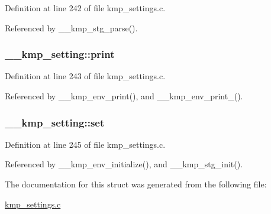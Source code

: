 Definition at line 242 of file kmp\-\_\-settings.\-c.



Referenced by \-\_\-\-\_\-kmp\-\_\-stg\-\_\-parse().

\hypertarget{struct____kmp__setting_a411e543047308db1d704cbff3cf03c95}{
\subsubsection[{print}]{ \-\_\-\-\_\-kmp\-\_\-setting\-::print}}\label{struct____kmp__setting_a411e543047308db1d704cbff3cf03c95}


Definition at line 243 of file kmp\-\_\-settings.\-c.



Referenced by \-\_\-\-\_\-kmp\-\_\-env\-\_\-print(), and \-\_\-\-\_\-kmp\-\_\-env\-\_\-print\-\_().

\hypertarget{struct____kmp__setting_aa0dba7f42f393fcaf2d82bf985d10027}{
\subsubsection[{set}]{ \-\_\-\-\_\-kmp\-\_\-setting\-::set}}\label{struct____kmp__setting_aa0dba7f42f393fcaf2d82bf985d10027}


Definition at line 245 of file kmp\-\_\-settings.\-c.



Referenced by \-\_\-\-\_\-kmp\-\_\-env\-\_\-initialize(), and \-\_\-\-\_\-kmp\-\_\-stg\-\_\-init().



The documentation for this struct was generated from the following file\-:\begin{DoxyCompactItemize}
\item 
\hyperlink{kmp__settings_8c}{kmp\-\_\-settings.\-c}\end{DoxyCompactItemize}
